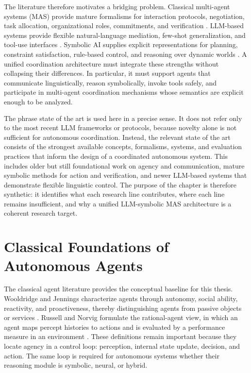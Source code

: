 The literature therefore motivates a bridging problem. Classical multi-agent systems (MAS) provide mature formalisms for interaction protocols, negotiation, task allocation, organizational roles, commitments, and verification \cite{wooldridge2009introduction,weiss2013multiagent,ferber1999multi,singh1999commitments}. LLM-based systems provide flexible natural-language mediation, few-shot generalization, and tool-use interfaces \cite{ouyang2022training,schick2023toolformer,mialon2023augmented}. Symbolic AI supplies explicit representations for planning, constraint satisfaction, rule-based control, and reasoning over dynamic worlds \cite{ghallab2004automated,reiter2001knowledge,hogan2021knowledge}. A unified coordination architecture must integrate these strengths without collapsing their differences. In particular, it must support agents that communicate linguistically, reason symbolically, invoke tools safely, and participate in multi-agent coordination mechanisms whose semantics are explicit enough to be analyzed.

The phrase state of the art is used here in a precise sense. It does not refer only to the most recent LLM frameworks or protocols, because novelty alone is not sufficient for autonomous coordination. Instead, the relevant state of the art consists of the strongest available concepts, formalisms, systems, and evaluation practices that inform the design of a coordinated autonomous system. This includes older but still foundational work on agency and communication, mature symbolic methods for action and verification, and newer LLM-based systems that demonstrate flexible linguistic control. The purpose of the chapter is therefore synthetic: it identifies what each research line contributes, where each line remains insufficient, and why a unified LLM-symbolic MAS architecture is a coherent research target.

\section{Classical Foundations of Autonomous Agents}

The classical agent literature provides the conceptual baseline for this thesis. Wooldridge and Jennings characterize agents through autonomy, social ability, reactivity, and proactiveness, thereby distinguishing agents from passive objects or services \cite{wooldridge1995intelligent}. Russell and Norvig formulate the rational-agent view, in which an agent maps percept histories to actions and is evaluated by a performance measure in an environment \cite{russell2021artificial}. These definitions remain important because they locate agency in a control loop: perception, internal state update, decision, and action. The same loop is required for autonomous systems whether their reasoning module is symbolic, neural, or hybrid.

